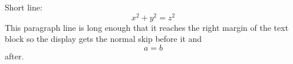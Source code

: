 \documentclass[10pt,leqno]{article}
\begin{document}
Short line:
\begin{equation} x^2 + y^2 = z^2 \end{equation}
This paragraph line is long enough that it reaches the right margin of the text block so the display gets the normal skip before it and
\begin{equation} a = b \end{equation}
after.
\end{document}
